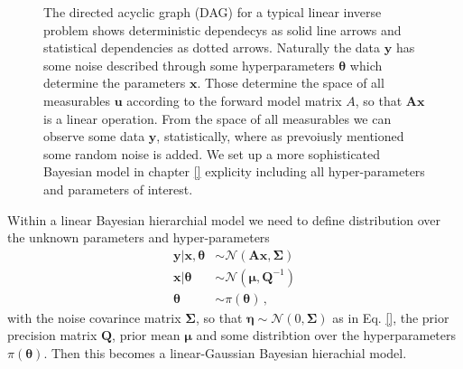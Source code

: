 \begin{figure}[ht!]
	\centering
	\caption[Bayesian Inference DAG]{The directed acyclic graph (DAG) for a typical linear inverse problem shows deterministic dependecys as solid line arrows and statistical dependencies as dotted arrows.
	Naturally the data $\bm{y}$ has some noise described through some hyperparameters $\bm{\theta}$ which determine the parameters $\bm{x}$. Those determine the space of all measurables $\bm{u}$ according to the forward model matrix $A$, so that $\bm{Ax}$ is a linear operation.
	From the space of all measurables we can observe some data $\bm{y}$, statistically, where as prevoiusly mentioned some random noise is added.
	We set up a more sophisticated Bayesian model in chapter \ref{} explicity including all hyper-parameters and parameters of interest.}
	\label{fig:FirstDAG}
\end{figure}

Within a linear Bayesian hierarchial model we need to define distribution over the unknown parameters and hyper-parameters
\begin{subequations}
	\begin{align}
		\bm{y}|\bm{x}, \bm{\theta}&\sim \mathcal{N}(\bm{A} \bm{x}, \bm{\Sigma}) \label{eq:likelihood}  \\
		\bm{x}| \bm{\theta} & \sim  \mathcal{N}( \bm{\mu}, \bm{Q}^{-1}  ) \label{eq:xPrior} \\
		\bm{\theta} &\sim  \pi(\bm{\theta}) \label{eq:gammaPrior}\, ,
	\end{align}
	\label{eq:BayMode}
\end{subequations}
with the noise covarince matrix $\bm{\Sigma}$, so that $\bm{\eta}  \sim \mathcal{N}(0, \bm{\Sigma}) $ as in Eq. \ref{}, the prior precision matrix $\bm{Q}$, prior mean $\bm{\mu}$
and some distribtion over the hyperparameters $\pi(\bm{\theta})$.
Then this becomes a linear-Gaussian Bayesian hierachial model.

